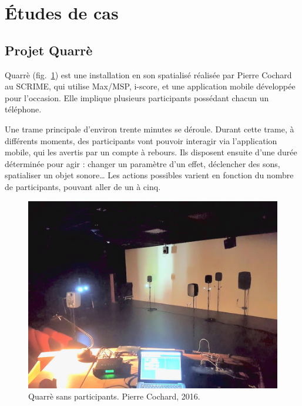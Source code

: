 \documentclass{article}
\begin{document}
\section{Études de cas}

\subsection{Projet Quarrè}
Quarrè (fig.~\ref{img.quarre}) est une installation en son spatialisé réalisée par Pierre Cochard au SCRIME, qui utilise Max/MSP, i-score, et une application mobile développée pour l'occasion. 
Elle implique plusieurs participants possédant chacun un téléphone.

Une trame principale d'environ trente minutes se déroule.
Durant cette trame, à différents moments, des participants vont pouvoir interagir via l'application mobile, qui les avertis par un compte à rebours. 
Ils disposent ensuite d'une durée déterminée pour agir : changer un paramètre d'un effet, déclencher des sons, spatialiser un objet sonore\dots 
Les actions possibles varient en fonction du nombre de participants, pouvant aller de un à cinq.


\begin{figure}[h]
    \centering
    \includegraphics[scale=0.2]{images/quarre.jpg}
    \caption{Quarrè sans participants. Pierre Cochard, 2016.}
    \label{img.quarre}
\end{figure}
\end{document}
